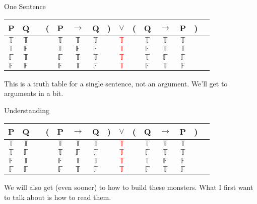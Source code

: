 \documentclass[
  ignorenonframetext,
]{beamer}
\renewcommand{\,}{\text{, }}
\def\True{\mathbb{T}}
\def\False{\mathbb{F}}
\begin{document}
\begin{frame}{One Sentence}
\protect\hypertarget{one-sentence}{}
\begin{center}
\begin{tabular}{@{ }c@{ }@{ }c | c@{ }@{}c@{}@{ }c@{ }@{ }c@{ }@{ }c@{ }@{}c@{}@{ }c@{ }@{}c@{}@{ }c@{ }@{ }c@{ }@{ }c@{ }@{}c@{}@{ }c}
P & Q &  & ( & P & $\rightarrow$ & Q & ) & $\lor$ & ( & Q & $\rightarrow$ & P & ) & \\
\hline 
$\True$ & $\True$ &  &  & $\True$ & $\True$ & $\True$ &  & \textcolor{red}{$\True$} &  & $\True$ & $\True$ & $\True$ &  & \\
$\True$ & $\False$ &  &  & $\True$ & $\False$ & $\False$ &  & \textcolor{red}{$\True$} &  & $\False$ & $\True$ & $\True$ &  & \\
$\False$ & $\True$ &  &  & $\False$ & $\True$ & $\True$ &  & \textcolor{red}{$\True$} &  & $\True$ & $\False$ & $\False$ &  & \\
$\False$ & $\False$ &  &  & $\False$ & $\True$ & $\False$ &  & \textcolor{red}{$\True$} &  & $\False$ & $\True$ & $\False$ &  & \\
\end{tabular}

\end{center}

This is a truth table for a single sentence, not an argument. We'll get
to arguments in a bit.
\end{frame}

\begin{frame}{Understanding}
\protect\hypertarget{understanding}{}
\begin{center}
\begin{tabular}{@{ }c@{ }@{ }c | c@{ }@{}c@{}@{ }c@{ }@{ }c@{ }@{ }c@{ }@{}c@{}@{ }c@{ }@{}c@{}@{ }c@{ }@{ }c@{ }@{ }c@{ }@{}c@{}@{ }c}
P & Q &  & ( & P & $\rightarrow$ & Q & ) & $\lor$ & ( & Q & $\rightarrow$ & P & ) & \\
\hline 
$\True$ & $\True$ &  &  & $\True$ & $\True$ & $\True$ &  & \textcolor{red}{$\True$} &  & $\True$ & $\True$ & $\True$ &  & \\
$\True$ & $\False$ &  &  & $\True$ & $\False$ & $\False$ &  & \textcolor{red}{$\True$} &  & $\False$ & $\True$ & $\True$ &  & \\
$\False$ & $\True$ &  &  & $\False$ & $\True$ & $\True$ &  & \textcolor{red}{$\True$} &  & $\True$ & $\False$ & $\False$ &  & \\
$\False$ & $\False$ &  &  & $\False$ & $\True$ & $\False$ &  & \textcolor{red}{$\True$} &  & $\False$ & $\True$ & $\False$ &  & \\
\end{tabular}

\end{center}

We will also get (even sooner) to how to build these monsters. What I
first want to talk about is how to read them.
\end{frame}
\end{document}
